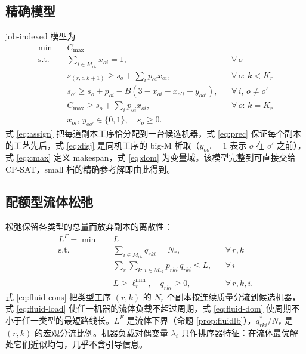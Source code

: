 \subsection{精确模型}\label{sec:model}
job-indexed 模型为
\begin{align}
\min\quad & C_{\max} \label{eq:obj}\\
\text{s.t.}\quad & \textstyle\sum_{i \in M_{rk}} x_{oi} = 1, && \forall\, o \label{eq:assign}\\
& s_{(r,c,k+1)} \ge s_o + \textstyle\sum_{i} p_{oi} x_{oi}, && \forall\, o:\, k < K_r \label{eq:prec}\\
& s_{o'} \ge s_o + p_{oi} - B(3{-}x_{oi}{-}x_{o'i}{-}y_{oo'}), && \forall\,i,\,o{\ne}o' \label{eq:disj}\\
& C_{\max} \ge s_o + \textstyle\sum_{i} p_{oi} x_{oi}, && \forall\, o:\, k = K_r \label{eq:cmax}\\
& x_{oi},\, y_{oo'} \in \{0,1\},\quad s_o \ge 0. \label{eq:dom}
\end{align}
式 \eqref{eq:assign} 把每道副本工序恰分配到一台候选机器，式 \eqref{eq:prec} 保证每个副本的工艺先后，式 \eqref{eq:disj} 是同机工序的 big-M 析取（$y_{oo'} = 1$ 表示 $o$ 在 $o'$ 之前），式 \eqref{eq:cmax} 定义 makespan，式 \eqref{eq:dom} 为变量域。该模型完整到可直接交给 CP-SAT\cite{ortools}，small 档的精确参考解即由此得到。

\subsection{配额型流体松弛}\label{sec:fluid}
松弛保留各类型的总量而放弃副本的离散性：
\begin{align}
L^F = \min\quad & L \label{eq:fluid-obj}\\
\text{s.t.}\quad & \textstyle\sum_{i \in M_{rk}} q_{rki} = N_r, && \forall\, r, k \label{eq:fluid-cons}\\
& \textstyle\sum_{r}\sum_{k:\, i \in M_{rk}} p_{rki}\, q_{rki} \le L, && \forall\, i \label{eq:fluid-load}\\
& L \ge \ell_r^{\min},\quad q_{rki} \ge 0, && \forall\, r, k, i. \label{eq:fluid-dom}
\end{align}
式 \eqref{eq:fluid-cons} 把类型工序 $(r,k)$ 的 $N_r$ 个副本按连续质量分流到候选机器，式 \eqref{eq:fluid-load} 使任一机器的流体负载不超过周期，式 \eqref{eq:fluid-dom} 使周期不小于任一类型的最短路线长。$L^F$ 是流体下界（命题 \ref{prop:fluidlb}），$q^*_{rki}/N_r$ 是 $(r,k)$ 的宏观分流比例。机器负载对偶变量 $\lambda_i$ 只作排序器特征：在流体最优解处它们近似均匀，几乎不含引导信息。

